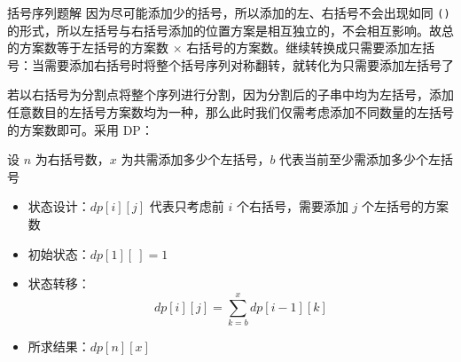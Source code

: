 \documentclass{pptt}
\begin{document}
\begin{frame}{括号序列}{题解}
    因为尽可能添加少的括号，所以添加的左、右括号不会出现如同 \texttt{()} 的形式，所以左括号与右括号添加的位置方案是相互独立的，不会相互影响。故总的方案数等于左括号的方案数 $\times$ 右括号的方案数。继续转换成只需要添加左括号：当需要添加右括号时将整个括号序列对称翻转，就转化为只需要添加左括号了

    若以右括号为分割点将整个序列进行分割，因为分割后的子串中均为左括号，添加任意数目的左括号方案数均为一种，那么此时我们仅需考虑添加不同数量的左括号的方案数即可。采用 DP：

    设 $n$ 为右括号数，$x$ 为共需添加多少个左括号，$b$ 代表当前至少需添加多少个左括号

    \begin{itemize}
        \item 状态设计：$dp[i][j]$ 代表只考虑前 $i$ 个右括号，需要添加 $j$ 个左括号的方案数
        \item 初始状态：$dp[1][~]=1$
        \item 状态转移：$$dp[i][j]=\sum_{k=b}^{x}dp[i-1][k]$$
        \item 所求结果：$dp[n][x]$
    \end{itemize}
\end{frame}
\end{document}
